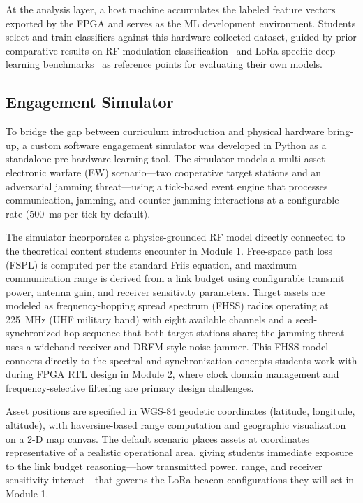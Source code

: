 \documentclass[conference]{IEEEtran}
\begin{document}
At the analysis layer, a host machine accumulates the labeled feature vectors exported by the FPGA and serves as the ML development environment. Students select and train classifiers against this hardware-collected dataset, guided by prior comparative results on RF modulation classification~\cite{b4} and LoRa-specific deep learning benchmarks~\cite{b5} as reference points for evaluating their own models.

\subsection{Engagement Simulator}

To bridge the gap between curriculum introduction and physical hardware bring-up, a custom software engagement simulator was developed in Python as a standalone pre-hardware learning tool. The simulator models a multi-asset electronic warfare (EW) scenario---two cooperative target stations and an adversarial jamming threat---using a tick-based event engine that processes communication, jamming, and counter-jamming interactions at a configurable rate (500~ms per tick by default).

The simulator incorporates a physics-grounded RF model directly connected to the theoretical content students encounter in Module 1. Free-space path loss (FSPL) is computed per the standard Friis equation, and maximum communication range is derived from a link budget using configurable transmit power, antenna gain, and receiver sensitivity parameters. Target assets are modeled as frequency-hopping spread spectrum (FHSS) radios operating at 225~MHz (UHF military band) with eight available channels and a seed-synchronized hop sequence that both target stations share; the jamming threat uses a wideband receiver and DRFM-style noise jammer. This FHSS model connects directly to the spectral and synchronization concepts students work with during FPGA RTL design in Module 2, where clock domain management and frequency-selective filtering are primary design challenges.

Asset positions are specified in WGS-84 geodetic coordinates (latitude, longitude, altitude), with haversine-based range computation and geographic visualization on a 2-D map canvas. The default scenario places assets at coordinates representative of a realistic operational area, giving students immediate exposure to the link budget reasoning---how transmitted power, range, and receiver sensitivity interact---that governs the LoRa beacon configurations they will set in Module 1.
\end{document}

